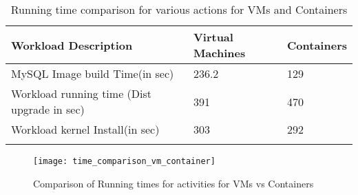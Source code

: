\begin{longtable}[t!]{|p{}|p{}|p{}|}
\hline\hline
\textbf{Workload Description}&\textbf{Virtual Machines}&\textbf{Containers}\\
\hline\hline
\hline
MySQL Image build Time(in sec)&236.2&129\\
\hline
Workload running time (Dist upgrade in sec)&391&470\\
\hline
Workload kernel Install(in sec)&303&292\\
\hline
\hline\hline

\label{tab:tab5}
\caption{Running time comparison for various actions for VMs and Containers \cite{sharma16}}
\end{longtable}




\begin{figure}[h!]
    \centering
    \texttt{[image: time\_comparison\_vm\_container]}
    \label{fig:13}
    \caption{Comparison of Running times for activities for VMs vs Containers \protect\cite{mach17}}
\end{figure}
